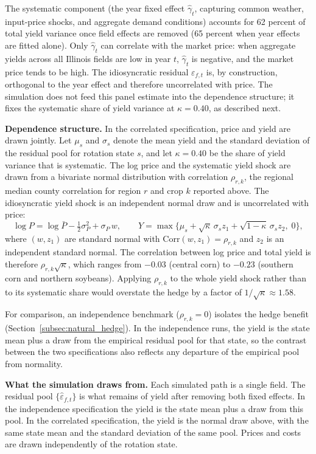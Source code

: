 \documentclass[11pt,letterpaper]{article}
\theoremstyle{remark}
\begin{document}
The systematic component (the year fixed effect $\hat{\gamma}_t$, capturing common weather, input-price shocks, and aggregate demand conditions) accounts for 62 percent of total yield variance once field effects are removed (65 percent when year effects are fitted alone). Only $\hat{\gamma}_t$ can correlate with the market price: when aggregate yields across all Illinois fields are low in year $t$, $\hat{\gamma}_t$ is negative, and the market price tends to be high. The idiosyncratic residual $\varepsilon_{f,t}$ is, by construction, orthogonal to the year effect and therefore uncorrelated with price. The simulation does not feed this panel estimate into the dependence structure; it fixes the systematic share of yield variance at $\kappa = 0.40$, as described next.
 
\textbf{Dependence structure.} In the correlated specification, price and yield are drawn jointly. Let $\mu_s$ and $\sigma_s$ denote the mean yield and the standard deviation of the residual pool for rotation state $s$, and let $\kappa = 0.40$ be the share of yield variance that is systematic. The log price and the systematic yield shock are drawn from a bivariate normal distribution with correlation $\rho_{r,k}$, the regional median county correlation for region $r$ and crop $k$ reported above. The idiosyncratic yield shock is an independent normal draw and is uncorrelated with price:
\begin{equation}
\log P = \log\bar{P} - \tfrac{1}{2}\sigma_P^2 + \sigma_P\, w, \qquad Y = \max\bigl\{\mu_s + \sqrt{\kappa}\,\sigma_s z_1 + \sqrt{1-\kappa}\,\sigma_s z_2,\; 0\bigr\},
\end{equation}
where $(w, z_1)$ are standard normal with $\text{Corr}(w, z_1) = \rho_{r,k}$ and $z_2$ is an independent standard normal. The correlation between log price and total yield is therefore $\rho_{r,k}\sqrt{\kappa}$, which ranges from $-0.03$ (central corn) to $-0.23$ (southern corn and northern soybeans). Applying $\rho_{r,k}$ to the whole yield shock rather than to its systematic share would overstate the hedge by a factor of $1/\sqrt{\kappa} \approx 1.58$.
 
For comparison, an independence benchmark ($\rho_{r,k} = 0$) isolates the hedge benefit (Section~\ref{subsec:natural_hedge}). In the independence runs, the yield is the state mean plus a draw from the empirical residual pool for that state, so the contrast between the two specifications also reflects any departure of the empirical pool from normality.
 
\textbf{What the simulation draws from.} Each simulated path is a single field. The residual pool $\{\hat{\varepsilon}_{f,t}\}$ is what remains of yield after removing both fixed effects. In the independence specification the yield is the state mean plus a draw from this pool. In the correlated specification, the yield is the normal draw above, with the same state mean and the standard deviation of the same pool. Prices and costs are drawn independently of the rotation state.
 
\end{document}
